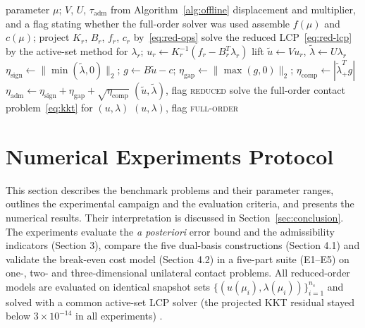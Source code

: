 \documentclass[11pt,a4paper]{article}
\begin{document}
\begin{algorithm}[htbp]\small
\caption{Online query with the admissibility circuit breaker.}\label{alg:online}
\begin{algorithmic}[1]
\Require parameter $\mu$; $V$, $U$, $\tau_{\mathrm{adm}}$ from Algorithm~\ref{alg:offline}
\Ensure displacement and multiplier, and a flag stating whether the full-order solver was used
\State assemble $f(\mu)$ and $c(\mu)$; project $K_r$, $B_r$, $f_r$, $c_r$ by~\eqref{eq:red-ops} 
\State solve the reduced LCP~\eqref{eq:red-lcp} by the active-set method for $\lambda_r$; $u_r\gets K_r^{-1}(f_r-B_r^T\lambda_r)$
\State lift $\tilde u\gets Vu_r$, $\tilde\lambda\gets U\lambda_r$
\State $\eta_{\mathrm{sign}}\gets\|\min(\tilde\lambda,0)\|_2$; $g\gets B\tilde u-c$; $\eta_{\mathrm{gap}}\gets\|\max(g,0)\|_2$; $\eta_{\mathrm{comp}}\gets|\tilde\lambda_+^Tg|$
\State $\eta_{\mathrm{adm}}\gets\eta_{\mathrm{sign}}+\eta_{\mathrm{gap}}+\sqrt{\eta_{\mathrm{comp}}}$ 
  \State \Return $(\tilde u,\tilde\lambda)$, flag \textsc{reduced}
\Else
  \State solve the full-order contact problem~\eqref{eq:kkt} for $(u,\lambda)$
  \State \Return $(u,\lambda)$, flag \textsc{full-order}
\EndIf
\end{algorithmic}
\end{algorithm}

\section{Numerical Experiments Protocol}
\label{sec:experiments}

This section describes the benchmark problems and their parameter ranges, outlines the experimental campaign and the evaluation criteria, and presents the numerical results. Their interpretation is discussed in Section~\ref{sec:conclusion}. The experiments evaluate the \emph{a posteriori} error bound and the admissibility indicators (Section 3), compare the five dual-basis constructions (Section 4.1) and validate the break-even cost model (Section 4.2) in a five-part suite (E1--E5) on one-, two- and three-dimensional unilateral contact problems. All reduced-order models are evaluated on identical snapshot sets \(\{(u(\mu_i), \lambda(\mu_i))\}_{i=1}^{n_s}\) and solved with a common active-set LCP solver (the projected KKT residual stayed below \(3 \times 10^{-14}\) in all experiments) \cite{balajewicz2016projection, benaceur2020reduced, leberre2022condition}.
\end{document}
